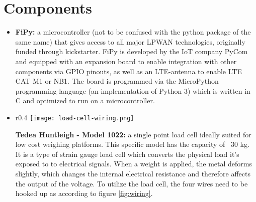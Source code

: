 
\section{Components}  
\begin{itemize}
  
  \item \textbf{FiPy:} a microcontroller (not to be confused with the python package of the same name) that gives access to all major LPWAN technologies, originally funded through kickstarter.\cite{fipy-kickstarter} FiPy is developed by the IoT company PyCom\cite{pycom} and equipped with an expansion board to enable integration with other components via GPIO pinouts, as well as an LTE-antenna to enable LTE CAT M1 or NB1.\cite{fipy-docs} The board is programmed via the MicroPython programming language (an implementation of Python 3) which is written in C and optimized to run on a microcontroller.\cite{micropython-github}


  \item 
    \parbox[t]{\dimexpr\textwidth-\leftmargin}{%
    \vspace{-2.5mm}
    \begin{wrapfigure}{r}{0.4\textwidth}
      \centering
      \vspace{-\baselineskip}
      \texttt{[image: load-cell-wiring.png]}
      \caption{Wiring schematic\cite{load-cell-manual}}
      \label{fig:wiring}
    \end{wrapfigure}
    \textbf{Tedea Huntleigh - Model 1022:} a single point load cell ideally suited for low cost weighing platforms. This specific model has the capacity of ~30 kg.\cite{load-cell-manual} It is a type of strain gauge load cell which converts the physical load it's exposed to to electrical signals. When a weight is applied, the metal deforms slightly, which changes the internal electrical resistance and therefore affects the output of the voltage.\cite{strain-gauge} To utilize the load cell, the four wires need to be hooked up as according to figure \ref{fig:wiring}.
    }



\end{itemize}
